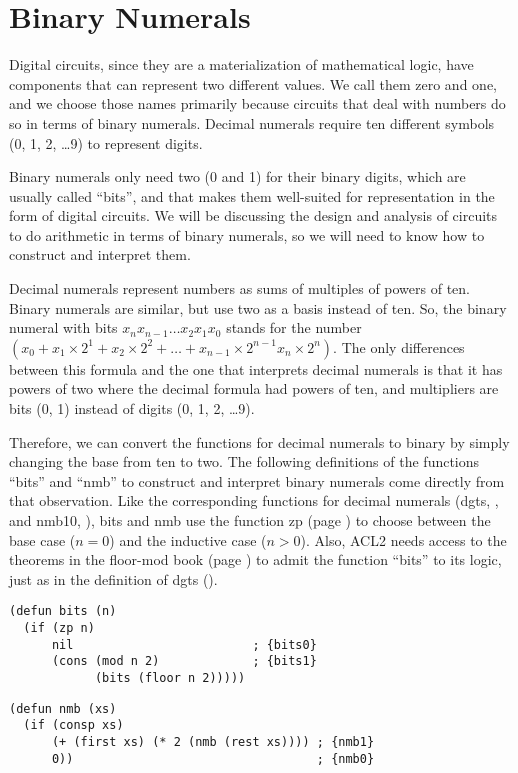 \section{Binary Numerals}
\label{sec:binary-numerals}

Digital circuits, since they are a materialization of mathematical logic,
have components that can represent two different values.
We call them zero and one, and we choose those names primarily
because circuits that deal with numbers do so in terms of binary numerals.
Decimal numerals require ten different symbols (0, 1, 2, \dots 9)
to represent digits.

Binary numerals only need two (0 and 1) for their binary digits,
which are usually called ``bits'', and that makes them well-suited
for representation in the form of digital circuits.
We will be discussing the design and analysis of circuits to do
arithmetic in terms of binary numerals, so we will need to know
how to construct and interpret them.

Decimal numerals represent numbers as sums of multiples of powers of ten.
Binary numerals are similar, but use two as a basis instead of ten.
So, the binary numeral with bits $x_nx_{n-1}\dots x_2x_1x_0$ stands for the number
$(x_0 + x_1 \times 2^1 + x_2 \times 2^2 + \dots + x_{n-1} \times 2^{n-1} x_{n} \times 2^{n})$.
The only differences between this formula and the one that interprets
decimal numerals is that it has powers of two where the decimal formula had
powers of ten, and multipliers are bits (0, 1) instead of
digits (0, 1, 2, \dots 9).

Therefore, we can convert the functions for decimal numerals to binary
by simply changing the base from ten to two.
The following definitions of the functions ``bits'' and ``nmb''
to construct and interpret binary numerals come directly
from that observation.
Like the corresponding functions for decimal numerals
(dgts, \pageref{dgts-defun}, and nmb10, \pageref{nmb10-defun}),
bits and nmb use the function zp (page \pageref{zp-def}) to choose
between the base case ($n = 0$) and the inductive case ($n > 0$).
Also, ACL2 needs access to the theorems
in the floor-mod book (page \pageref{floor-mod-book})
to admit the function ``bits'' to its logic,
just as in the definition of dgts (\pageref{dgts-defun}).

\label{bits-defun}
\begin{Verbatim}
(defun bits (n)
  (if (zp n)
      nil                         ; {bits0}
      (cons (mod n 2)             ; {bits1}
            (bits (floor n 2)))))
\end{Verbatim}
\label{nmb-defun}
\begin{Verbatim}
(defun nmb (xs)
  (if (consp xs)
      (+ (first xs) (* 2 (nmb (rest xs)))) ; {nmb1}
      0))                                  ; {nmb0}
\end{Verbatim}

